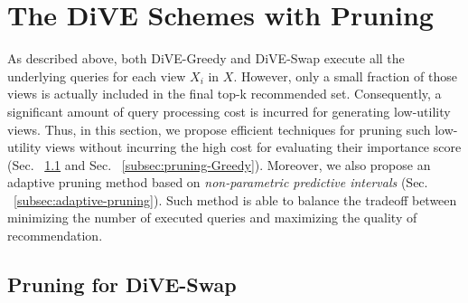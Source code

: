 

\section{The D\texorpdfstring{\MakeLowercase{i}}{}VE Schemes with Pruning}\label{sec:pruning}
As described above, both DiVE-Greedy and DiVE-Swap execute all the underlying queries for each view $X_i$ in $X$. 
%
However, only a small fraction of those views is actually included in the final top-k recommended set. 
%
Consequently, a significant amount of query processing cost is incurred for generating low-utility views. 
%
Thus, in this section, we propose efficient techniques for pruning such low-utility views without incurring the high cost for evaluating their importance score (Sec. ~\ref{subsec:pruning-Swap} and Sec. ~\ref{subsec:pruning-Greedy}).
Moreover, we also propose an adaptive pruning method based on {\em non-parametric predictive intervals} (Sec. ~\ref{subsec:adaptive-pruning}). 
%
Such method is able to balance the tradeoff between minimizing the number of executed queries and maximizing the quality of recommendation. 

% 



\subsection{Pruning for DiVE-Swap}
\label{subsec:pruning-Swap}

